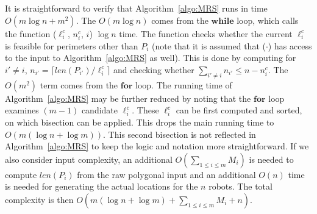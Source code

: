 It is straightforward to verify that Algorithm~\ref{algo:MRS} runs in 
time $O(m\log n + m^2)$. The $O(m\log n)$ comes from the $\mathbf{while}$ 
loop, which calls the function \isLFeasible($\ell_i^c$, $n_i^c$, $i$) 
$\log n$ time. The function checks whether the current $\ell_i^c$ is 
feasible for perimeters other than $P_i$ (note that it is assumed that 
\isLFeasible($\cdot$) has access to the input to Algorithm~\ref{algo:MRS} 
as well). This is done by computing for $i' \ne i$, $n_{i'} = \lceil 
len(P_{i'})/\ell_i^c \rceil$ and checking whether $\sum_{{i'} \ne i}n_{i'} 
\le n - n_i^c$. The $O(m^2)$ term comes from the $\mathbf{for}$ loop. 
The running time of Algorithm~\ref{algo:MRS} may be further reduced by 
noting that the $\mathbf{for}$ loop examines $(m-1)$ candidate 
$\ell_i^c$. These $\ell_i^c$ can be first computed and sorted, on which 
bisection can be applied. This drops the main running time to 
$O(m(\log n + \log m))$. This second bisection is not reflected in 
Algorithm~\ref{algo:MRS} to keep the logic and notation more 
straightforward. If we also consider input complexity, an additional 
$O(\sum_{1\le i \le m} M_i)$ is needed to compute $len(P_i)$ from the raw polygonal 
input and an additional $O(n)$ time is needed for generating the actual
locations for the $n$ robots. The total complexity is then $O(m(\log n + 
\log m) + \sum_{1\le i \le m} M_i + n)$.
\vspace*{-3mm}
